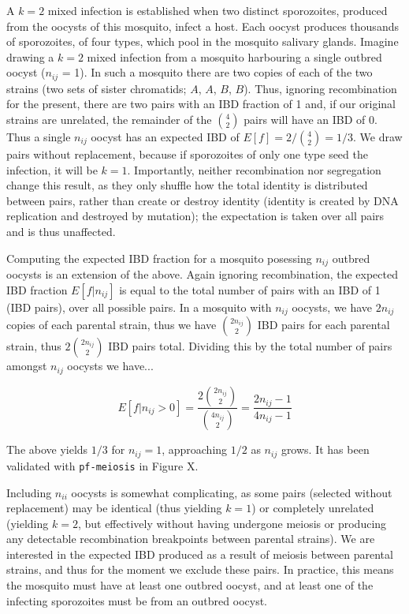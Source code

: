 \documentclass[9pt,lineno]{elife}
\begin{document}
A $k=2$ mixed infection is established when two distinct sporozoites, produced from the oocysts of this mosquito, infect a host. Each oocyst produces thousands of sporozoites, of four types, which pool in the mosquito salivary glands. Imagine drawing a $k=2$ mixed infection from a mosquito harbouring a single outbred oocyst ($n_{ij}$ = 1). In such a mosquito there are two copies of each of the two strains (two sets of sister chromatids; $A$, $A$, $B$, $B$). Thus, ignoring recombination for the present, there are two pairs with an IBD fraction of 1 and, if our original strains are unrelated, the remainder of the ${4 \choose 2}$ pairs will have an IBD of 0. Thus a single $n_{ij}$ oocyst has an expected IBD of $E[f]= 2/{4 \choose 2} = 1/3$. We draw pairs without replacement, because if sporozoites of only one type seed the infection, it will be $k=1$.  Importantly, neither recombination nor segregation change this result, as they only shuffle how the total identity is distributed between pairs, rather than create or destroy identity (identity is created by DNA replication and destroyed by mutation); the expectation is taken over all pairs and is thus unaffected.

Computing the expected IBD fraction for a mosquito posessing $n_{ij}$ outbred oocysts is an extension of the above. Again ignoring recombination, the expected IBD fraction $E[f|n_{ij}]$ is equal to the total number of pairs with an IBD of 1 (IBD pairs), over all possible pairs. In a mosquito with $n_{ij}$ oocysts, we have $2n_{ij}$ copies of each parental strain, thus we have ${2n_{ij} \choose 2}$ IBD pairs for each parental strain, thus $2 {2n_{ij} \choose 2}$ IBD pairs total. Dividing this by the total number of pairs amongst $n_{ij}$ oocysts we have...

\begin{equation} \label{eq1}
E[f|n_{ij} > 0] = \frac{2{2n_{ij} \choose 2}}{{4n_{ij} \choose 2}} = \frac{2n_{ij} - 1}{4n_{ij} - 1}
\end{equation}

The above yields $1/3$ for $n_{ij}=1$, approaching $1/2$ as $n_{ij}$ grows. It has been validated with \texttt{pf-meiosis} in Figure X.

Including $n_{ii}$ oocysts is somewhat complicating, as some pairs (selected without replacement) may be identical (thus yielding $k=1$) or completely unrelated (yielding $k=2$, but effectively without having undergone meiosis or producing any detectable recombination breakpoints between parental strains).  We are interested in the expected IBD produced as a result of meiosis between parental strains, and thus for the moment we exclude these pairs. In practice, this means the mosquito must have at least one outbred oocyst, and at least one of the infecting sporozoites must be from an outbred oocyst.
\end{document}
